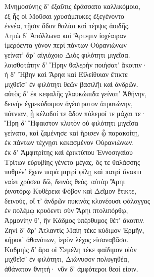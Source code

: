 \begin{pages}
\begin{Leftside}
\quad{}Μνημοσύνης δ' ἐξαῦτις ἐράσσατο καλλικόμοιο,  \\
ἐξ ἧς οἱ Μοῦσαι χρυσάμπυκες ἐξεγένοντο\\
ἐννέα, τῇσιν ἅδον θαλίαι καὶ τέρψις ἀοιδῆς.\\

\quad{}Λητὼ δ' Ἀπόλλωνα καὶ Ἄρτεμιν ἰοχέαιραν \\
ἱμερόεντα γόνον περὶ πάντων Οὐρανιώνων\\
γείνατ' ἄρ' αἰγιόχοιο Διὸς φιλότητι μιγεῖσα. \\

\quad{}λοισθοτάτην δ' Ἥρην θαλερὴν ποιήσατ' ἄκοιτιν· \\
ἡ δ' Ἥβην καὶ Ἄρηα καὶ Εἰλείθυιαν ἔτικτε \\
μιχθεῖσ' ἐν φιλότητι θεῶν βασιλῆι καὶ ἀνδρῶν. \\

\quad{}αὐτὸς δ' ἐκ κεφαλῆς γλαυκώπιδα γείνατ' Ἀθήνην, \\
δεινὴν ἐγρεκύδοιμον ἀγέστρατον ἀτρυτώνην,  \\
πότνιαν, ᾗ κέλαδοί τε ἅδον πόλεμοί τε μάχαι τε· \\
Ἥρη δ' Ἥφαιστον κλυτὸν οὐ φιλότητι μιγεῖσα\\
γείνατο, καὶ ζαμένησε καὶ ἤρισεν ᾧ παρακοίτῃ,\\
ἐκ πάντων τέχνῃσι κεκασμένον Οὐρανιώνων.\\

\quad{}ἐκ δ' Ἀμφιτρίτης καὶ ἐρικτύπου Ἐννοσιγαίου \\
Τρίτων εὐρυβίης γένετο μέγας, ὅς τε θαλάσσης \\
πυθμέν' ἔχων παρὰ μητρὶ φίλῃ καὶ πατρὶ ἄνακτι\\
ναίει χρύσεα δῶ, δεινὸς θεός. αὐτὰρ Ἄρηι\\
ῥινοτόρῳ Κυθέρεια Φόβον καὶ Δεῖμον ἔτικτε, \\
δεινούς, οἵ τ' ἀνδρῶν πυκινὰς κλονέουσι φάλαγγας \\
ἐν πολέμῳ κρυόεντι σὺν Ἄρηι πτολιπόρθῳ,\\
Ἁρμονίην θ', ἣν Κάδμος ὑπέρθυμος θέτ' ἄκοιτιν. \\

\quad{}Ζηνὶ δ' ἄρ' Ἀτλαντὶς Μαίη τέκε κύδιμον Ἑρμῆν,\\
κήρυκ' ἀθανάτων, ἱερὸν λέχος εἰσαναβᾶσα.\\

\quad{}Καδμηὶς δ' ἄρα οἱ Σεμέλη τέκε φαίδιμον υἱὸν  \\
μιχθεῖσ' ἐν φιλότητι, Διώνυσον πολυγηθέα, \\
ἀθάνατον θνητή· νῦν δ' ἀμφότεροι θεοί εἰσιν. \\


\end{Leftside}
\end{pages}
